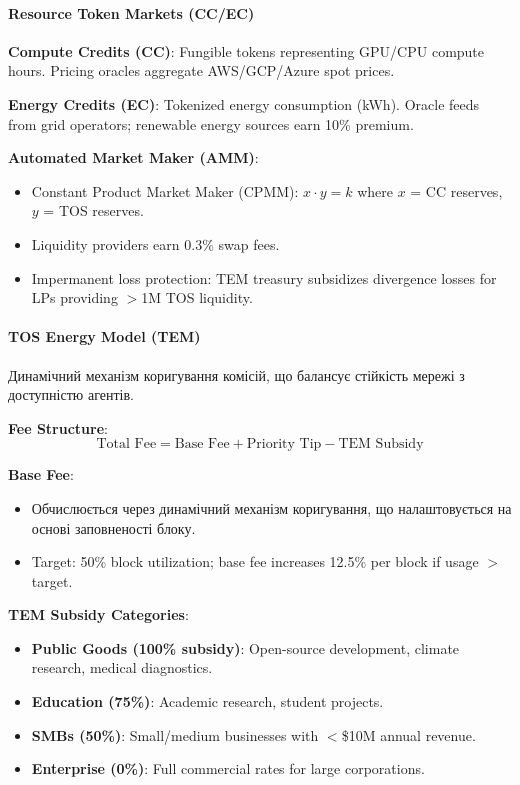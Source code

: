 \documentclass[11pt]{article}
\begin{document}
\paragraph{Resource Token Markets (CC/EC)}
\textbf{Compute Credits (CC)}: Fungible tokens representing GPU/CPU compute hours. Pricing oracles aggregate AWS/GCP/Azure spot prices.

\textbf{Energy Credits (EC)}: Tokenized energy consumption (kWh). Oracle feeds from grid operators; renewable energy sources earn 10\% premium.

\textbf{Automated Market Maker (AMM)}:
\begin{itemize}[noitemsep]
  \item Constant Product Market Maker (CPMM): $x \cdot y = k$ where $x$ = CC reserves, $y$ = TOS reserves.
  \item Liquidity providers earn 0.3\% swap fees.
  \item Impermanent loss protection: TEM treasury subsidizes divergence losses for LPs providing $>$1M TOS liquidity.
\end{itemize}

\paragraph{TOS Energy Model (TEM)}
Динамічний механізм коригування комісій, що балансує стійкість мережі з доступністю агентів.

\textbf{Fee Structure}:
\begin{equation}
\text{Total Fee} = \text{Base Fee} + \text{Priority Tip} - \text{TEM Subsidy}
\end{equation}

\textbf{Base Fee}:
\begin{itemize}[noitemsep]
  \item Обчислюється через динамічний механізм коригування, що налаштовується на основі заповненості блоку.
  \item Target: 50\% block utilization; base fee increases 12.5\% per block if usage $>$ target.
\end{itemize}

\textbf{TEM Subsidy Categories}:
\begin{itemize}[noitemsep]
  \item \textbf{Public Goods (100\% subsidy)}: Open-source development, climate research, medical diagnostics.
  \item \textbf{Education (75\%)}: Academic research, student projects.
  \item \textbf{SMBs (50\%)}: Small/medium businesses with $<$\$10M annual revenue.
  \item \textbf{Enterprise (0\%)}: Full commercial rates for large corporations.
\end{itemize}
\end{document}
